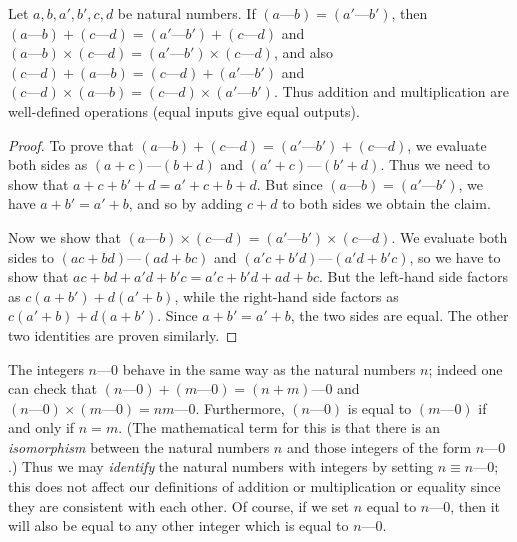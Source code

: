 \begin{lemma}\label{4.1.3}
  Let \(a, b, a', b', c, d\) be natural numbers.
  If \((a \text{---} b) = (a' \text{---} b')\), then \((a \text{---} b) + (c \text{---} d) = (a' \text{---} b') + (c \text{---} d)\) and \((a \text{---} b) \times (c \text{---} d) = (a' \text{---} b') \times (c \text{---} d)\), and also \((c \text{---} d) + (a \text{---} b) = (c \text{---} d) + (a' \text{---} b')\) and \((c \text{---} d) \times (a \text{---} b) = (c \text{---} d) \times (a' \text{---} b')\).
  Thus addition and multiplication are well-defined operations (equal inputs give equal outputs).
\end{lemma}

\begin{proof}
  To prove that \((a \text{---} b) + (c \text{---} d) = (a' \text{---} b') + (c \text{---} d)\), we evaluate both sides as \((a + c) \text{---} (b + d)\) and \((a' + c) \text{---} (b' + d)\).
  Thus we need to show that \(a + c + b' + d = a' + c + b + d\).
  But since \((a \text{---} b) = (a' \text{---} b')\), we have \(a + b' = a' + b\), and so by adding \(c + d\) to both sides we obtain the claim.

  Now we show that \((a \text{---} b) \times (c \text{---} d) = (a' \text{---} b') \times (c \text{---} d)\).
  We evaluate both sides to \((ac + bd) \text{---} (ad + bc)\) and \((a'c + b'd) \text{---} (a'd + b'c)\), so we have to show that \(ac + bd + a'd + b'c = a'c + b'd + ad + bc\).
  But the left-hand side factors as \(c(a + b') + d(a' + b)\), while the right-hand side factors as \(c(a' + b) + d(a + b')\).
  Since \(a + b' = a' + b\), the two sides are equal.
  The other two identities are proven similarly.
\end{proof}

\begin{note}
  The integers \(n \text{---} 0\) behave in the same way as the natural numbers \(n\);
  indeed one can check that \((n \text{---} 0) + (m \text{---} 0) = (n + m) \text{---} 0\) and \((n \text{---} 0) \times (m \text{---} 0) = nm \text{---} 0\).
  Furthermore, \((n \text{---} 0)\) is equal to \((m \text{---} 0)\) if and only if \(n = m\).
  (The mathematical term for this is that there is an \emph{isomorphism} between the natural numbers \(n\) and those integers of the form \(n \text{---} 0\).)
  Thus we may \emph{identify} the natural numbers with integers by setting \(n \equiv n \text{---} 0\);
  this does not affect our definitions of addition or multiplication or equality since they are consistent with each other.
  Of course, if we set \(n\) equal to \(n \text{---} 0\), then it will also be equal to any other integer which is equal to \(n \text{---} 0\).
\end{note}

